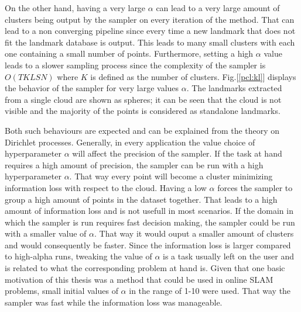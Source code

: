 \documentclass[twoside,hidelinks]{article}
\begin{document}
On the other hand, having a very large $\alpha$ can lead to a very large amount of clusters being output by the sampler on every iteration of the method. That can lead to a non converging pipeline since every time a new landmark that does not fit the landmark database is output. This leads to many small clusters with each one containing a small number of points. Furthermore, setting a high $\alpha$ value leads to a slower sampling process since the complexity of the sampler is $O(TKLSN)$ where $K$ is defined as the number of clusters. Fig.[\ref{pcl:kl}] displays the behavior of the sampler for very large values $\alpha$. The landmarks extracted from a single cloud are shown as spheres; it can be seen that the cloud is not visible and the majority of the points is considered as standalone landmarks.

Both such behaviours are expected and can be explained from the theory on Dirichlet processes\cite{dependent}. Generally, in every application the value choice of hyperparameter $\alpha$ will affect the precision of the sampler. If the task at hand requires a high amount of precision, the sampler can be run with a high hyperparameter $\alpha$. That way every point will become a cluster minimizing information loss with respect to the cloud. Having a low $\alpha$ forces the sampler to group a high amount of points in the dataset together. That leads to a high amount of information loss and is not usefull in most scenarios. If the domain in which the sampler is run requires fast decision making, the sampler could be run with a smaller value of $\alpha$. That way it would ouput a smaller amount of clusters and would consequently be faster. Since the information loss is larger compared to high-alpha runs, tweaking the value of $\alpha$ is a task usually left on the user and is related to  what the corresponding problem at hand is. Given that one basic motivation of this thesis was a method that could be used in online SLAM problems, small initial values of $\alpha$ in the range of 1-10 were used. That way the sampler was fast while the information loss was manageable.
\end{document}
